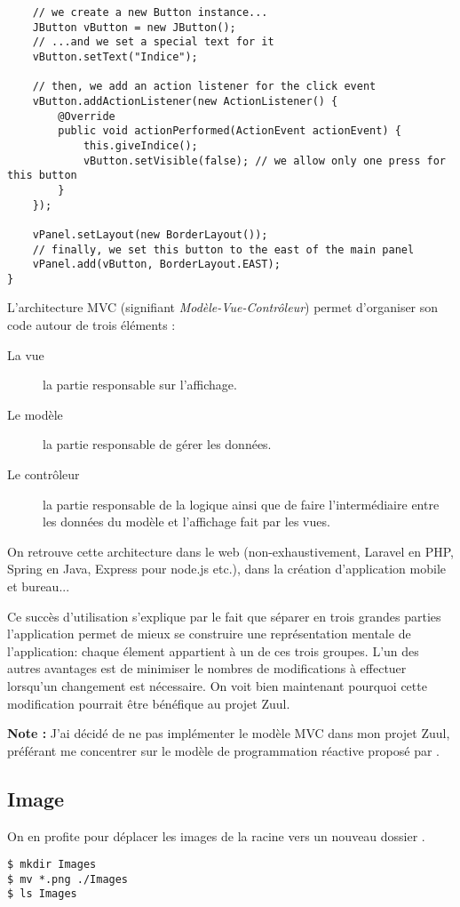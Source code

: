 \begin{exercise}[subtitle=getCommandList]
\begin{verbatim}
    // we create a new Button instance...
    JButton vButton = new JButton();
    // ...and we set a special text for it
    vButton.setText("Indice");
    
    // then, we add an action listener for the click event
    vButton.addActionListener(new ActionListener() {
        @Override
        public void actionPerformed(ActionEvent actionEvent) {
            this.giveIndice();
            vButton.setVisible(false); // we allow only one press for this button
        }
    });

    vPanel.setLayout(new BorderLayout());
    // finally, we set this button to the east of the main panel
    vPanel.add(vButton, BorderLayout.EAST);
}
\end{verbatim}
\end{exercise}

\begin{exercise}[subtitle=Modèle-Vue-Contrôleur]

L'architecture MVC (signifiant \emph{Modèle-Vue-Contrôleur}) permet d'organiser son code autour de trois éléments :

\begin{description} 
  \item[La vue] la partie responsable sur l'affichage.
  \item[Le modèle] la partie responsable de gérer les données.
  \item[Le contrôleur] la partie responsable de la logique ainsi que de faire l'intermédiaire entre les données du modèle et l'affichage fait par les vues.
\end{description}

On retrouve cette architecture dans le web (non-exhaustivement, Laravel en PHP, Spring en Java, Express pour node.js etc.), dans la création d'application mobile et bureau...

Ce succès d'utilisation s'explique par le fait que séparer en trois grandes parties l'application permet de mieux se construire une représentation mentale de l'application: chaque élement appartient à un de ces trois groupes. L'un des autres avantages est de minimiser le nombres de modifications à effectuer lorsqu'un changement est nécessaire. On voit bien maintenant pourquoi cette modification pourrait être bénéfique au projet Zuul.

\textbf{Note :} J'ai décidé de ne pas implémenter le modèle MVC dans mon projet Zuul, préférant me concentrer sur le modèle de programmation réactive proposé par . 

\subsection*{Image}

On en profite pour déplacer les images de la racine vers un nouveau dossier .

\begin{verbatim}
$ mkdir Images
$ mv *.png ./Images
$ ls Images
\end{verbatim}
\end{exercise}


